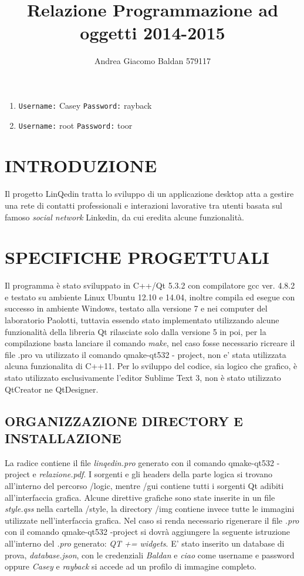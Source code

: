 \documentclass[10pt,a4paper]{article}
\title{Relazione Programmazione ad oggetti 2014-2015}
\author{Andrea Giacomo Baldan 579117}
\begin{document}
\maketitle
\begingroup
\let\clearpage\relax
\begin{enumerate}
    \item
    \texttt{Username:} Casey
    \texttt{Password:} rayback
    \item
    \texttt{Username:} root
    \texttt{Password:} toor
\end{enumerate}
\section*{INTRODUZIONE}
Il progetto LinQedin tratta lo sviluppo di un applicazione desktop atta a gestire una rete di contatti professionali e interazioni lavorative tra utenti
basata sul famoso \textit{social network} Linkedin\textcopyright, da cui eredita alcune funzionalità.
\section*{SPECIFICHE PROGETTUALI}
Il programma è stato sviluppato in C++/Qt 5.3.2 con compilatore gcc ver. 4.8.2 e testato su ambiente Linux Ubuntu 12.10 e 14.04, inoltre compila ed esegue con successo in ambiente Windows, testato
alla versione 7 e nei computer del laboratorio Paolotti, tuttavia essendo stato implementato utilizzando alcune funzionalità della libreria Qt rilasciate solo dalla versione 5 in poi, per
la compilazione basta lanciare il comando \textit{make}, nel caso fosse necessario ricreare il file .pro va utilizzato il comando qmake-qt532 - project, non e' stata utilizzata alcuna funzionalita di C++11.
Per lo sviluppo del codice, sia logico che grafico, è stato utilizzato esclusivamente l'editor Sublime Text 3, non è stato utilizzato QtCreator ne QtDesigner.
\subsection*{ORGANIZZAZIONE DIRECTORY E INSTALLAZIONE}
La radice contiene il file \textit{linqedin.pro} generato con il comando qmake-qt532 -project e \textit{relazione.pdf}.
I sorgenti e gli headers della parte logica si trovano all'interno del percorso /logic, mentre /gui contiene tutti i sorgenti Qt adibiti all'interfaccia grafica.
Alcune direttive grafiche sono state inserite in un file \textit{style.qss} nella cartella /style, la directory /img contiene invece tutte le immagini utilizzate nell'interfaccia grafica.
Nel caso si renda necessario rigenerare il file \textit{.pro} con il comando qmake-qt532 -project si dovrà aggiungere la seguente istruzione all'interno del \textit{.pro} generato: \textit{QT += widgets}. E' stato inserito un database di prova, \textit{database.json}, con le credenziali \textit{Baldan} e \textit{ciao} come username e password oppure \textit{Casey} e \textit{rayback} si accede ad un profilo di immagine completo.





\endgroup
\end{document}
